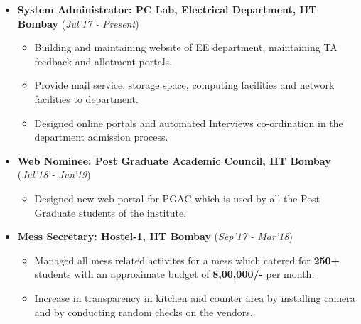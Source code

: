 \documentclass[10pt]{article}
\begin{document}
\begin{itemize}[leftmargin=0.4cm]
\vspace{-0.1cm}
\item \textbf {System Administrator: PC Lab, Electrical Department, IIT Bombay} 
\hfill{(\textit{Jul'17 - Present})}\\[-0.6cm]
    \begin{itemize}
	\item Building and maintaining website of EE department, maintaining TA feedback and allotment portals.\vspace{-0.1cm}
	\item Provide mail service, storage space, computing facilities and network facilities to department.\vspace{-0.1cm}
	\item Designed online portals and automated Interviews co-ordination in the department admission process.
	\end{itemize}
	\vspace{-0.25cm}
	
	
\item \textbf{Web Nominee: Post Graduate Academic Council, IIT Bombay}
\hfill{(\textit{Jul'18 - Jun'19})}\\[-0.6cm]
    \begin{itemize}
			\item Designed new web portal for PGAC which is used by all the Post Graduate students of the institute. \vspace{-0.1cm}	
	\end{itemize}
	\vspace{-0.25cm}

\item \textbf{Mess Secretary: Hostel-1, IIT Bombay}
\hfill{(\textit{Sep'17 - Mar'18})}\\[-0.6cm]
    \begin{itemize}
            \item Managed all mess related activites for a mess which catered for \textbf{250+} students with an approximate budget of \textbf{8,00,000/-} per month.\vspace{-0.1cm}
            \item Increase in transparency in kitchen and counter area by installing camera and by conducting random checks on the vendors.
	\end{itemize}
	\vspace{-0.25cm}	

    	
\end{itemize}
\vspace{0.15cm}
\end{document}
